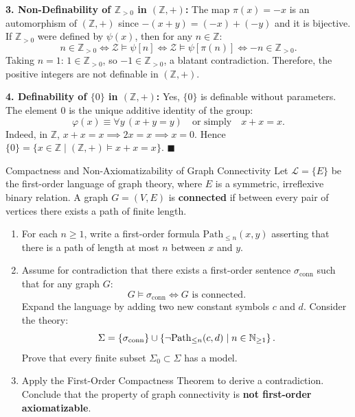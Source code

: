 \begin{solution}
\textbf{3. Non-Definability of $\mathbb{Z}_{> 0}$ in $(\mathbb{Z}, +)$:}
The map $\pi(x) = -x$ is an automorphism of $(\mathbb{Z}, +)$ since $-(x + y) = (-x) + (-y)$ and it is bijective.
If $\mathbb{Z}_{> 0}$ were defined by $\psi(x)$, then for any $n \in \mathbb{Z}$:
\[
n \in \mathbb{Z}_{> 0} \iff \mathcal{Z} \models \psi[n] \iff \mathcal{Z} \models \psi[\pi(n)] \iff -n \in \mathbb{Z}_{> 0}.
\]
Taking $n = 1$: $1 \in \mathbb{Z}_{> 0}$, so $-1 \in \mathbb{Z}_{> 0}$, a blatant contradiction.
Therefore, the positive integers are not definable in $(\mathbb{Z}, +)$.

\textbf{4. Definability of $\{0\}$ in $(\mathbb{Z}, +)$:}
Yes, $\{0\}$ is definable without parameters.
The element $0$ is the unique additive identity of the group:
\[
\varphi(x) \equiv \forall y\, (x + y = y) \quad \text{or simply} \quad x + x = x.
\]
Indeed, in $\mathbb{Z}$, $x + x = x \implies 2x = x \implies x = 0$.
Hence $\{0\} = \{ x \in \mathbb{Z} \mid (\mathbb{Z}, +) \models x + x = x \}$. \hfill $\blacksquare$
\end{solution}

\begin{exercise}{Compactness and Non-Axiomatizability of Graph Connectivity}
Let $\mathcal{L} = \{E\}$ be the first-order language of graph theory, where $E$ is a symmetric, irreflexive binary relation.
A graph $G = (V, E)$ is \textbf{connected} if between every pair of vertices there exists a path of finite length.
\begin{enumerate}[leftmargin=1.5em,itemsep=2pt]
  \item For each $n \ge 1$, write a first-order formula $\mathrm{Path}_{\le n}(x, y)$ asserting that there is a path of length at most $n$ between $x$ and $y$.
  \item Assume for contradiction that there exists a first-order sentence $\sigma_{\mathrm{conn}}$ such that for any graph $G$:
  \[
  G \models \sigma_{\mathrm{conn}} \iff G \text{ is connected.}
  \]
  Expand the language by adding two new constant symbols $c$ and $d$.
  Consider the theory:
  \[
  \Sigma = \{ \sigma_{\mathrm{conn}} \} \cup \left\{ \neg \mathrm{Path}_{\le n}(c, d) \;\middle|\; n \in \mathbb{N}_{\ge 1} \right\}.
  \]
  Prove that every finite subset $\Sigma_0 \subset \Sigma$ has a model.
  \item Apply the First-Order Compactness Theorem to derive a contradiction. Conclude that the property of graph connectivity is \textbf{not first-order axiomatizable}.
\end{enumerate}
\end{exercise}

